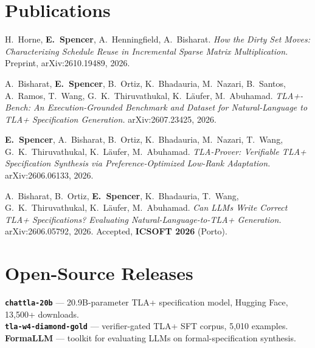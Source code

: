 \documentclass[letterpaper,10pt]{article}
\begin{document}
\resumeSubHeadingListEnd

\section*{Publications}
\begin{itemize}[leftmargin=0.15in, label={}]
  \small{
    \item{H.~Horne, \textbf{E.~Spencer}, A.~Henningfield, A.~Bisharat. \emph{How the Dirty Set Moves: Characterizing Schedule Reuse in Incremental Sparse Matrix Multiplication.} Preprint, arXiv:2610.19489, 2026. \vspace{2pt}}
    \item{A.~Bisharat, \textbf{E.~Spencer}, B.~Ortiz, K.~Bhadauria, M.~Nazari, B.~Santos, A.~Ramos, T.~Wang, G.~K.~Thiruvathukal, K.~L\"aufer, M.~Abuhamad. \emph{TLA+-Bench: An Execution-Grounded Benchmark and Dataset for Natural-Language to TLA+ Specification Generation.} arXiv:2607.23425, 2026. \vspace{2pt}}
    \item{\textbf{E.~Spencer}, A.~Bisharat, B.~Ortiz, K.~Bhadauria, M.~Nazari, T.~Wang, G.~K.~Thiruvathukal, K.~L\"aufer, M.~Abuhamad. \emph{TLA-Prover: Verifiable TLA+ Specification Synthesis via Preference-Optimized Low-Rank Adaptation.} arXiv:2606.06133, 2026. \vspace{2pt}}
    \item{A.~Bisharat, B.~Ortiz, \textbf{E.~Spencer}, K.~Bhadauria, T.~Wang, G.~K.~Thiruvathukal, K.~L\"aufer, M.~Abuhamad. \emph{Can LLMs Write Correct TLA+ Specifications? Evaluating Natural-Language-to-TLA+ Generation.} arXiv:2606.05792, 2026. Accepted, \textbf{ICSOFT 2026} (Porto).}
  }
\end{itemize}

\section*{Open-Source Releases}
\begin{itemize}[leftmargin=0.15in, label={}]
  \small{
    \item{\textbf{\texttt{chattla-20b}} --- 20.9B-parameter TLA+ specification model, Hugging Face, 13{,}500+ downloads. \\
    \textbf{\texttt{tla-w4-diamond-gold}} --- verifier-gated TLA+ SFT corpus, 5{,}010 examples. \\
    \textbf{FormaLLM} --- toolkit for evaluating LLMs on formal-specification synthesis.}
  }
\end{itemize}
\end{document}
